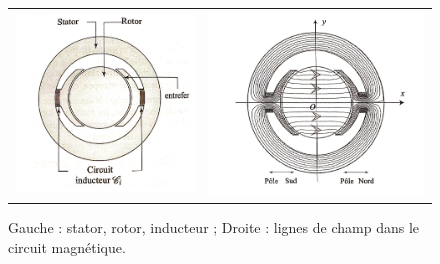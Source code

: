 \documentclass[11pt,a4paper]{report}
\begin{document}
\begin{figure}[h!]
	\begin{center}
	\begin{tabular}{cc}
		\includegraphics[scale = 0.60]{mcc_principe.png} &
		\includegraphics[scale = 0.60]{mcc_fieldlines.png}\\
	\end{tabular}
	\end{center}
	\caption{Gauche : stator, rotor, inducteur ; 
	Droite : lignes de champ dans le circuit magnétique.} 
	\label{fig:rails_Laplace}	
\end{figure}
		
\end{document}
